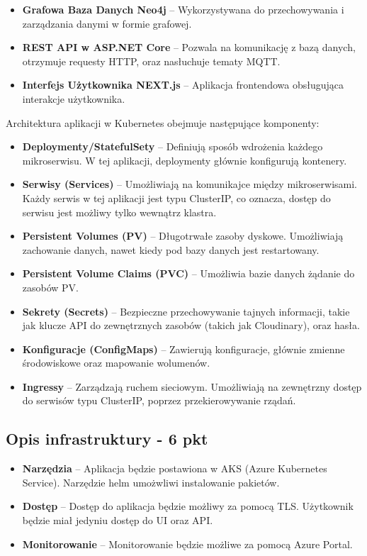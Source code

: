 \documentclass[12pt,a4paper]{article}
\begin{document}
\begin{itemize}
  \item \textbf{Grafowa Baza Danych Neo4j} -- Wykorzystywana do przechowywania i zarządzania danymi w formie grafowej.
  \item \textbf{REST API w ASP.NET Core} -- Pozwala na komunikację z bazą danych, otrzymuje requesty HTTP, oraz nasłuchuje tematy MQTT.
  \item \textbf{Interfejs Użytkownika NEXT.js} -- Aplikacja frontendowa obsługująca interakcje użytkownika.
\end{itemize}

Architektura aplikacji w Kubernetes obejmuje następujące komponenty:

\begin{itemize}
  \item \textbf{Deploymenty/StatefulSety} -- Definiują sposób wdrożenia każdego mikroserwisu. W tej aplikacji, deploymenty głównie konfigurują kontenery.
  \item \textbf{Serwisy (Services)} -- Umożliwiają na komunikajce między mikroserwisami. Każdy serwis w tej aplikacji jest typu ClusterIP, co oznacza, dostęp do serwisu jest możliwy tylko wewnątrz klastra.
  \item \textbf{Persistent Volumes (PV)} -- Długotrwałe zasoby dyskowe. Umożliwiają zachowanie danych, nawet kiedy pod bazy danych jest restartowany.
  \item \textbf{Persistent Volume Claims (PVC)} -- Umożliwia bazie danych żądanie do zasobów PV.
  \item \textbf{Sekrety (Secrets)} -- Bezpieczne przechowywanie tajnych informacji, takie jak klucze API do zewnętrznych zasobów (takich jak Cloudinary), oraz hasła.
  \item \textbf{Konfiguracje (ConfigMaps)} -- Zawierują konfiguracje, głównie zmienne środowiskowe oraz mapowanie wolumenów.
  \item \textbf{Ingressy} -- Zarządzają ruchem sieciowym. Umożliwiają na zewnętrzny dostęp do serwisów typu ClusterIP, poprzez przekierowywanie rządań.
\end{itemize}

\newpage

\subsection{Opis infrastruktury - 6 pkt}
\label{sec:Users}

\begin{itemize}
  \item \textbf{Narzędzia} -- Aplikacja będzie postawiona w AKS (Azure Kubernetes Service). Narzędzie helm umożwliwi instalowanie pakietów.
  \item \textbf{Dostęp} -- Dostęp do aplikacja będzie możliwy za pomocą TLS. Użytkownik będzie miał jedyniu dostęp do UI oraz API.
  \item \textbf{Monitorowanie} -- Monitorowanie będzie możliwe za pomocą Azure Portal.
\end{itemize}
\end{document}

